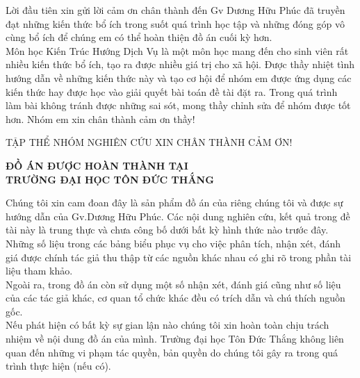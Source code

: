 \documentclass{article}
\begin{document}
\begin{flushleft}

	{\large Lời đầu tiên xin gửi lời cảm ơn chân thành đến Gv Dương Hữu Phúc đã truyền đạt những kiến thức bổ ích trong suốt quá trình học tập và những đóng góp vô cùng bổ ích để chúng em có thể hoàn thiện đồ án cuối kỳ hơn.\\
Môn học Kiến Trúc Hướng Dịch Vụ là một môn học mang đến cho sinh viên rất nhiều kiến thức bổ ích, tạo ra được nhiều giá trị cho xã hội. Được thầy nhiệt tình hướng dẫn về những kiến thức này và tạo cơ hội để nhóm em được ứng dụng các kiến thức hay được học vào giải quyết bài toán đề tài đặt ra. Trong quá trình làm bài không tránh được những sai sót, mong thầy chỉnh sửa để nhóm được tốt hơn. Nhóm em xin chân thành cảm ơn thầy!\\
	
}
	
\end{flushleft}
\begin{center}
	{\large TẬP THỂ NHÓM NGHIÊN CỨU XIN CHÂN THÀNH CẢM ƠN!}
	
\end{center}
\newpage
\begin{center}
\textbf	{  \large ĐỒ ÁN ĐƯỢC HOÀN THÀNH
		TẠI\\ TRƯỜNG ĐẠI HỌC TÔN ĐỨC THẮNG}
	
\end{center}
\begin{flushleft}
	
	{\large Chúng tôi xin cam đoan đây là sản phẩm đồ án của riêng chúng tôi và được sự hướng dẫn của Gv.Dương Hữu Phúc. Các nội dung nghiên cứu, kết quả trong đề tài này là trung thực và chưa công bố dưới bất kỳ hình thức nào trước đây. Những số liệu trong các bảng biểu phục vụ cho việc phân tích, nhận xét, đánh giá được chính tác giả thu thập từ các nguồn khác nhau có ghi rõ trong phần tài liệu tham khảo.\\
		
	}
	{\large  Ngoài ra, trong đồ án còn sử dụng một số nhận xét, đánh giá cũng như số liệu của các tác giả khác, cơ quan tổ chức khác đều có trích dẫn và chú thích nguồn gốc.\\
	
}
	{\large Nếu phát hiện có bất kỳ sự gian lận nào chúng tôi xin hoàn toàn chịu trách nhiệm về nội dung đồ án của mình. Trường đại học Tôn Đức Thắng không liên quan đến những vi phạm tác quyền, bản quyền do chúng tôi gây ra trong quá trình thực hiện (nếu có).\\
	
}
\end{flushleft}
\end{document}
